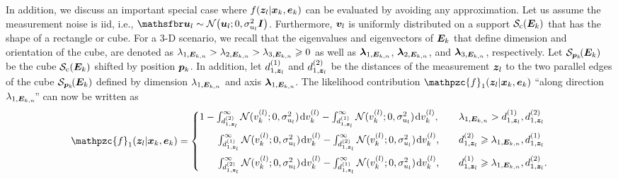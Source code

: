 \documentclass[11pt,a4paper]{article}
\newcommand{\ist}{\hspace*{.3mm}}
\newcommand{\rmv}{\hspace*{-.3mm}}
\newcommand{\nn}{\nonumber}
\begin{document}
In addition, we discuss an important special case where $f(\bm{z}_{l} | \bm{x}_{k}, \bm{e}_{k})$ can be evaluated by avoiding any approximation. Let us assume the measurement noise is iid, i.e., $\RV{u}_{l} \sim \mathcal{N}\big(\V{u}_{l} ;0,\sigma^2_{u_{l}} \M{I}\big)$. Furthermore, $\bm{v}_l$ is uniformly distributed on a support $\Set{S}_{\mathrm{c}}(\M{E}_{k})$ that has the shape of a rectangle or cube. For a 3-D scenario, we recall that the eigenvalues and  eigenvectors of $\M{E}_{k}$ that define dimension and orientation of the cube, are denoted as $\lambda_{1,\M{E}_{k,n}} > \lambda_{2,\M{E}_{k,n}} > \lambda_{3,\M{E}_{k,n}} \geq 0$ as well as  $\protect\V{\lambda}_{1,\M{E}_{k,n}}$, $\protect\V{\lambda}_{2,\M{E}_{k,n}}$, and $\protect\V{\lambda}_{3,\M{E}_{k,n}}$, respectively.  Let $\Set{S}_{\V{p}_{k}}\rmv\rmv(\M{E}_{k})$ be the cube $\Set{S}_{\mathrm{c}}(\M{E}_{k})$ shifted by position $\bm{p}_{k}$. In addition, let $d^{(1)}_{1,\bm{z}_l}$ and $d^{(2)}_{1,\bm{z}_l}$ be the distances of the measurement $\bm{z}_l$ to the two parallel edges of the cube $\Set{S}_{\V{p}_{k}}\rmv\rmv(\M{E}_{k})$ defined by dimension $\lambda_{1,\M{E}_{k,n}}$ and axis $\V{\lambda}_{1,\M{E}_{k,n}}\rmv$. The likelihood contribution $\mathpzc{f}_1(\V{z}_{l} | \V{x}_{k}, \V{e}_{k})$ ``along direction $\lambda_{1,\M{E}_{k,n}}\rmv\rmv$'' can now be written\vspace{0mm} as 
\begin{align}
 &\mathpzc{f}_1(\V{z}_{l} | \V{x}_{k}, \V{e}_{k}) =  \begin{cases}
   1- \int^{\infty}_{d^{(2)}_{1,\V{z}_l}}  \mathcal{N}(v^{(l)}_{k};0,\sigma^2_{u_{l}} ) \ist \mathrm{d} v^{(l)}_k - \int^{\infty}_{d^{(1)}_{1,\V{z}_l}}  \mathcal{N}(v^{(l)}_{k};0,\sigma^2_{u_{l}} ) \ist \mathrm{d} v^{(l)}_k, &  \quad \lambda_{1,\M{E}_{k,n}} > d^{(1)}_{1,\V{z}_l}, d^{(2)}_{1,\V{z}_l} \\[3mm]
  \hspace{6.5mm}  \int^{\infty}_{d^{(1)}_{1,\V{z}_l}}  \mathcal{N}(v^{(l)}_{k};0,\sigma^2_{u_{l}} ) \ist \mathrm{d} v^{(l)}_k - \int^{\infty}_{d^{(2)}_{1,\V{z}_l}}  \mathcal{N}(v^{(l)}_{k};0,\sigma^2_{u_{l}} ) \ist \mathrm{d} v^{(l)}_k, & \quad d^{(2)}_{1,\V{z}_l} \geq \lambda_{1,\M{E}_{k,n}}, d^{(1)}_{1,\V{z}_l} \\[3mm]
     \hspace{6.5mm} \int^{\infty}_{d^{(2)}_{1,\V{z}_l}}  \mathcal{N}(v^{(l)}_{k};0,\sigma^2_{u_{l}} ) \ist \mathrm{d} v^{(l)}_k - \int^{\infty}_{d^{(1)}_{1,\V{z}_l}}  \mathcal{N}(v^{(l)}_{k};0,\sigma^2_{u_{l}} ) \ist  \mathrm{d} v^{(l)}_k, & \quad d^{(1)}_{1,\V{z}_l} \geq  \lambda_{1,\M{E}_{k,n}}, d^{(2)}_{1,\V{z}_l}. \nn
   \end{cases} \\[-1mm]
   \label{eq:likelihood3D}  \\[-8mm]
   \nn
\end{align}
\end{document}

